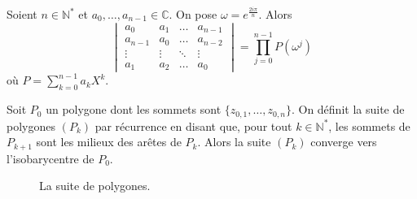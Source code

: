 
  \begin{lemma}
    Soient $n \in \mathbb{N}^*$ et $a_0, \dots, a_{n-1} \in \mathbb{C}$. On pose $\omega = e^{\frac{2i\pi}{n}}$. Alors
    \[ \begin{vmatrix} a_0 & a_1 & \dots & a_{n-1} \\ a_{n-1} & a_0 & \dots & a_{n-2}\\ \vdots & \vdots & \ddots & \vdots \\ a_1 & a_2 & \dots & a_0 \end{vmatrix} = \prod_{j=0}^{n-1} P(\omega^j) \]
    où $P = \sum_{k=0}^{n-1} a_k X^k$.
  \end{lemma}


  \begin{application}
    Soit $P_0$ un polygone dont les sommets sont $\{ z_{0,1}, \dots, z_{0,n} \}$. On définit la suite de polygones $(P_k)$ par récurrence en disant que, pour tout $k \in \mathbb{N}^*$, les sommets de $P_{k+1}$ sont les milieux des arêtes de $P_k$.
    \newpar
    Alors la suite $(P_k)$ converge vers l'isobarycentre de $P_0$.
  \end{application}

  \annexessection


  \begin{figure}[h]
    \begin{center}
    \end{center}
    \caption{La suite de polygones.}
  \end{figure}

